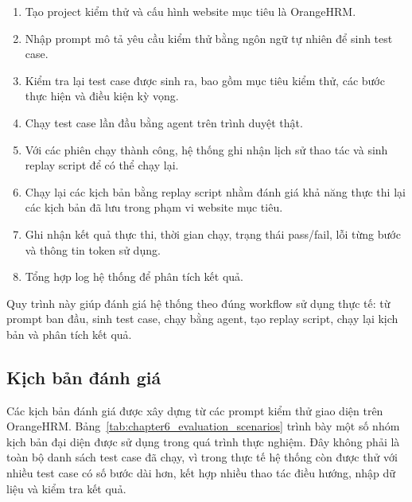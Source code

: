 \begin{enumerate}
    \item Tạo project kiểm thử và cấu hình website mục tiêu là OrangeHRM.
    \item Nhập prompt mô tả yêu cầu kiểm thử bằng ngôn ngữ tự nhiên để sinh test case.
    \item Kiểm tra lại test case được sinh ra, bao gồm mục tiêu kiểm thử, các bước thực hiện và điều kiện kỳ vọng.
    \item Chạy test case lần đầu bằng agent trên trình duyệt thật.
    \item Với các phiên chạy thành công, hệ thống ghi nhận lịch sử thao tác và sinh replay script để có thể chạy lại.
    \item Chạy lại các kịch bản bằng replay script nhằm đánh giá khả năng thực thi lại các kịch bản đã lưu trong phạm vi website mục tiêu.
    \item Ghi nhận kết quả thực thi, thời gian chạy, trạng thái pass/fail, lỗi từng bước và thông tin token sử dụng.
    \item Tổng hợp log hệ thống để phân tích kết quả.
\end{enumerate}

Quy trình này giúp đánh giá hệ thống theo đúng workflow sử dụng thực tế: từ prompt ban đầu, sinh test case, chạy bằng agent, tạo replay script, chạy lại kịch bản và phân tích kết quả.

\subsection{Kịch bản đánh giá}

Các kịch bản đánh giá được xây dựng từ các prompt kiểm thử giao diện trên OrangeHRM. Bảng~\ref{tab:chapter6_evaluation_scenarios} trình bày một số nhóm kịch bản đại diện được sử dụng trong quá trình thực nghiệm. Đây không phải là toàn bộ danh sách test case đã chạy, vì trong thực tế hệ thống còn được thử với nhiều test case có số bước dài hơn, kết hợp nhiều thao tác điều hướng, nhập dữ liệu và kiểm tra kết quả.

